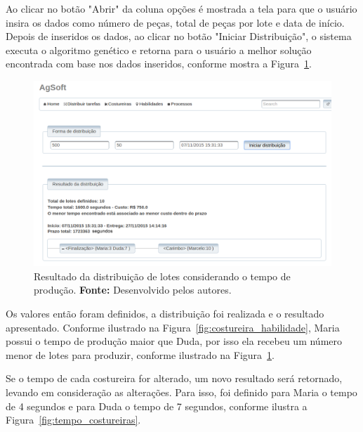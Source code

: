 \par Ao clicar no botão "Abrir" da coluna opções é mostrada a tela para que o
usuário insira os dados como número de peças, total de peças por lote e data de
início. Depois de inseridos os dados, ao clicar no botão "Iniciar Distribuição", o sistema executa
o algoritmo genético e retorna para o usuário a melhor solução
encontrada com base nos dados inseridos, conforme mostra a
Figura~\ref{fig:resultado_distribuicao_teste1}.

\begin{figure}[h!]
	\centerline{\includegraphics[width=14.7cm]{./imagens/resultado_distribuicao_teste1.png}}
	\caption[Resultado da distribuição de lotes considerando o tempo de produção.]
	{Resultado da distribuição de lotes considerando o tempo de produção. \textbf{Fonte:} Desenvolvido pelos
	autores.}
	\label{fig:resultado_distribuicao_teste1}
\end{figure}

\par Os valores então foram definidos, a distribuição foi realizada e o resultado apresentado. 
Conforme ilustrado na Figura~\ref{fig:costureira_habilidade}, Maria possui
o tempo de produção maior que Duda, por isso ela recebeu um número menor de lotes
para produzir, conforme ilustrado na
Figura~\ref{fig:resultado_distribuicao_teste1}.

\par Se o tempo de cada costureira for alterado, um novo resultado será
retornado, levando em consideração as alterações. Para isso, foi definido para
Maria o tempo de 4 segundos e para Duda o tempo de 7 segundos, conforme ilustra
a Figura~\ref{fig:tempo_costureiras}. 

\newpage

